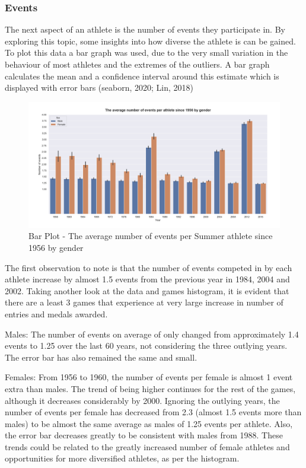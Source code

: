 \documentclass[a4 paper, 12pt]{article}
\begin{document}
        \subsubsection{Events}
        The next aspect of an athlete is the number of events they participate in. By exploring this topic, some insights into how diverse the athlete is can be gained. To plot this data a bar graph was used, due to the very small variation in the behaviour of most athletes and the extremes of the outliers. A bar graph calculates the mean and a confidence interval around this estimate which is displayed with error bars (seaborn, 2020; Lin, 2018)
        \begin{figure} [H]
            \centering
            \includegraphics[width=\textwidth, frame]
                {./images/graph/athlete_event_barplot.png}      
                \caption{Bar Plot - The average number of events per Summer athlete since 1956 by gender} 
        \end{figure}
        The first observation to note is that the number of events competed in by each athlete increase by almost 1.5 events from the previous year in 1984, 2004 and 2002.  Taking another look at the data and games histogram, it is evident that there are a least 3 games that experience at very large increase in number of entries and medals awarded. 

        Males: The number of events on average of only changed from approximately 1.4 events to 1.25 over the last 60 years, not considering the three outlying years. The error bar has also remained the same and small. 

        Females: From 1956 to 1960, the number of events per female is almost 1 event extra than males. The trend of being higher continues for the rest of the games, although it decreases considerably by 2000. Ignoring the outlying years, the number of events per female has decreased from 2.3 (almost 1.5 events more than males) to be almost the same average as males of 1.25 events per athlete. Also, the error bar decreases greatly to be consistent with males from 1988. These trends could be related to the greatly increased number of female athletes and opportunities for more diversified athletes, as per the histogram.         
\end{document}
